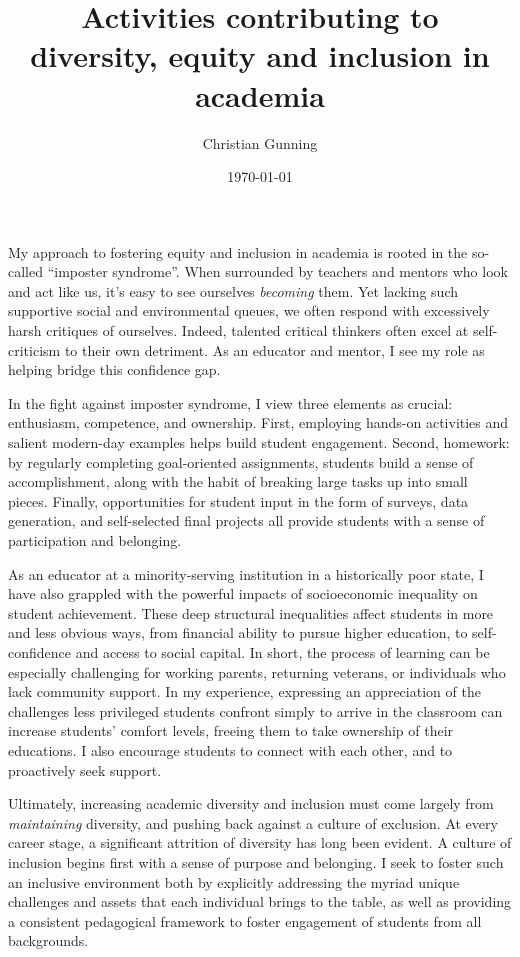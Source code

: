 \documentclass[12pt]{article}
\author{Christian Gunning}
\title{Activities contributing to\\diversity, equity and inclusion in academia}
\date{\today}
\begin{document}
\maketitle

My approach to fostering equity and inclusion in academia 
is rooted in the so-called ``imposter syndrome''.  When surrounded by 
teachers and mentors who look and act like us, it's easy to 
see ourselves {\em becoming} them.  Yet lacking such supportive 
social and environmental queues, we often respond with excessively
harsh critiques of ourselves. Indeed, talented critical thinkers often 
excel at self-criticism to their own detriment.
As an educator and mentor, I see my role as helping
bridge this confidence gap.

In the fight against imposter syndrome, I view three 
elements as crucial: enthusiasm, competence, and ownership.
First, employing hands-on
activities and salient modern-day examples helps build student engagement.
Second, homework: by regularly completing goal-oriented assignments, 
students build a sense of accomplishment, along with the habit of 
breaking large tasks up into small pieces.  Finally, opportunities
for student input in the form of surveys, data generation, and 
self-selected final projects all provide students with a sense 
of participation and belonging. 

As an educator at a minority-serving institution in
a historically poor state, I have also grappled with the powerful
impacts of socioeconomic inequality on student achievement. 
These deep structural inequalities affect students in more 
and less obvious ways, from financial ability to pursue higher 
education, to self-confidence and access to social capital.
In short, the process of learning can be especially challenging
for working parents, returning veterans, or individuals who
lack community support. In my experience, expressing an 
appreciation of the challenges less privileged students confront
simply to arrive in the classroom can increase students'
comfort levels, freeing them to take ownership of their educations.
I also encourage students to connect with each other,
and to proactively seek support.

Ultimately, increasing academic diversity and inclusion must 
come largely from {\em maintaining} diversity, and pushing back
against a culture of exclusion. At every career stage, a
significant attrition of diversity has long been 
evident. A culture of inclusion begins first with a sense of 
purpose and belonging. I seek to foster such an inclusive 
environment both by explicitly addressing the myriad unique 
challenges and 
assets that each individual brings to the table, as well as 
providing a consistent pedagogical framework to foster 
engagement of students from all backgrounds. 
\end{document}
